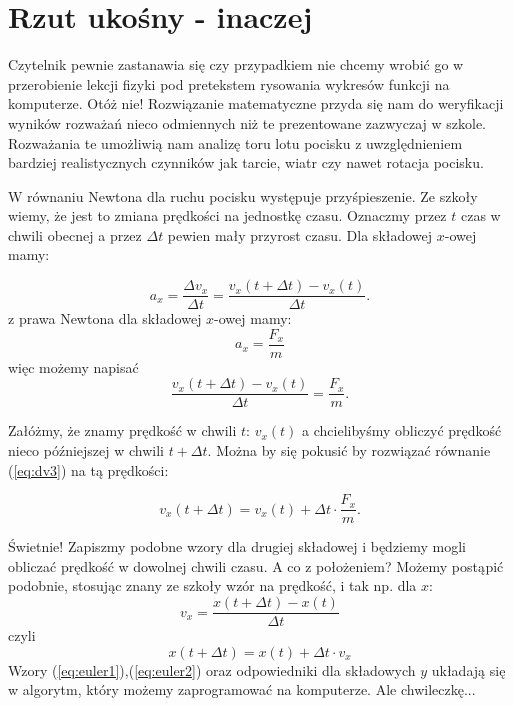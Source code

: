 \documentclass[10pt,twocolumn]{article}
\begin{document}
\section{Rzut ukośny - inaczej}

Czytelnik pewnie zastanawia się czy przypadkiem nie chcemy wrobić go w
przerobienie lekcji fizyki pod pretekstem rysowania wykresów funkcji
na komputerze. Otóż nie! Rozwiązanie matematyczne przyda się nam do
weryfikacji wyników rozważań nieco odmiennych niż te prezentowane
zazwyczaj w szkole. Rozważania te umożliwią nam analizę toru lotu
pocisku z uwzględnieniem bardziej realistycznych czynników jak tarcie,
wiatr czy nawet rotacja pocisku. 

W równaniu Newtona dla ruchu pocisku występuje przyśpieszenie. Ze
szkoły wiemy, że jest to zmiana prędkości na jednostkę czasu.
Oznaczmy przez $t$ czas w chwili obecnej a przez $\Delta t$ pewien
mały przyrost czasu. Dla składowej $x$-owej mamy:

\begin{equation}
a_x = \frac{\Delta v_x}{\Delta t}=\frac{v_x(t+\Delta t)-v_x(t)}{\Delta t}. 
\label{eq:dv} 
\end{equation}
%
z prawa Newtona dla składowej $x$-owej mamy:
%
\begin{equation}
a_x = \frac{F_x}{m}
\label{eq:dv} 
\end{equation}
%
więc możemy napisać 
%
\begin{equation}
\frac{v_x(t+\Delta t)-v_x(t)}{\Delta t} = \frac{F_x}{m}.
\label{eq:dv3} 
\end{equation}
 
Załóżmy, że znamy prędkość w chwili $t$: $v_x(t)$ a chcielibyśmy
obliczyć prędkość nieco późniejszej w chwili $t+\Delta t$.  Można by
się pokusić by rozwiązać równanie (\ref{eq:dv3}) na tą prędkości:

\begin{equation}
v_x(t+\Delta t) =v_x(t) + \Delta t\cdot  \frac{F_x}{m}.
\label{eq:euler1} 
\end{equation}
  
Świetnie! Zapiszmy podobne wzory dla drugiej składowej i będziemy
mogli obliczać prędkość w dowolnej chwili czasu. A co z położeniem?
Możemy postąpić podobnie, stosując znany ze szkoły wzór na prędkość,
i tak np. dla $x$:
\begin{equation}
  v_x = \frac{x(t+\Delta t)-x(t)}{\Delta t}
\label{eq:dx}  
\end{equation}
czyli
\begin{equation}
x(t+\Delta t)= x(t)+ \Delta t \cdot v_x 
\label{eq:euler2}
\end{equation}
%
Wzory (\ref{eq:euler1}),(\ref{eq:euler2}) oraz odpowiedniki dla składowych
$y$ układają się w algorytm, który możemy zaprogramować na
komputerze. Ale chwileczkę...
\end{document}
